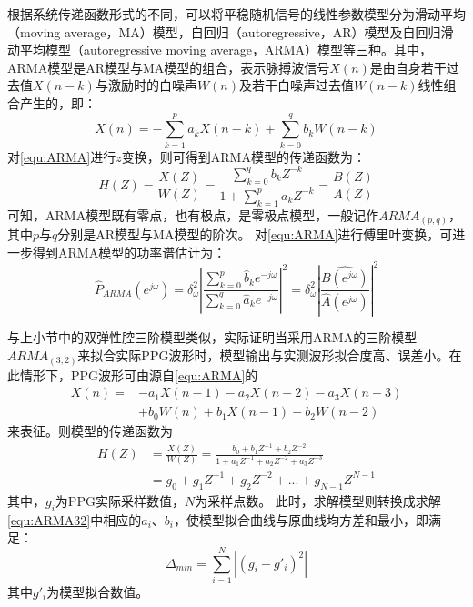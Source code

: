 根据系统传递函数形式的不同，可以将平稳随机信号的线性参数模型分为滑动平均（moving average，MA）模型，自回归（autoregressive，AR）模型及自回归滑动平均模型（autoregressive moving average，ARMA）模型等三种。其中，
ARMA模型是AR模型与MA模型的组合，表示脉搏波信号$X(n)$是由自身若干过去值$X(n-k)$与激励时的白噪声$W(n)$及若干白噪声过去值$W(n-k)$线性组合产生的，即：
\begin{equation}
    \label{equ:ARMA}
    X(n)=-\sum_{k=1}^{p}a_{k}X(n-k)+\sum_{k=0}^{q}b_{k}W(n-k)
\end{equation}
对\autoref{equ:ARMA}进行$z$变换，则可得到ARMA模型的传递函数为：
\begin{equation}
    \label{equ:ARMAH}
    H(Z)=\frac{X(Z)}{W(Z)}=\frac{\sum_{k=0}^{q}b_{k}Z^{-k}}{1+\sum_{k=1}^{p}a_{k}Z^{-k}}=\frac{B(Z)}{A(Z)}
\end{equation}
可知，ARMA模型既有零点，也有极点，是零极点模型，一般记作$ARMA_{(p,q)}$，其中$p$与$q$分别是AR模型与MA模型的阶次。
对\autoref{equ:ARMA}进行傅里叶变换，可进一步得到ARMA模型的功率谱估计为\cite{Qiu2012}：
\begin{equation}
    \label{equ:ARMAP}
    \hat{P}_{ARMA}(e^{j\omega} )=
    \delta _{\omega}^2\left |  \frac{\sum_{k=0}^{p}\hat{b}_{k}e^{-j\omega}}{\sum_{k=0}^{q}\hat{a}_{k}e^{-j\omega}}\right |^2
    =\delta _{\omega}^2\left |  \frac{\hat{B(e^{j\omega} )}}{\hat{A}(e^{j\omega} )}\right |^2
\end{equation}

与上小节中的双弹性腔三阶模型类似，实际证明当采用ARMA的三阶模型$ARMA_{(3,2)}$来拟合实际PPG波形时，模型输出与实测波形拟合度高、误差小\cite{PPGYY}。在此情形下，PPG波形可由源自\autoref{equ:ARMA}的
\begin{equation}
    \label{equ:ARMA32}
    \begin{aligned}
        X(n)=&-a_{1}X(n-1)-a_{2}X(n-2)-a_{3}X(n-3)\\
        &+b_{0}W(n)+b_{1}X(n-1)+b_{2}W(n-2)
    \end{aligned}
\end{equation}
来表征。则模型的传递函数为
\begin{equation}
    \label{equ:ARMAH32}
    \begin{aligned}
        H(Z)&=\frac{X(Z)}{W(Z)}=\frac{b_{0}+b_{1}Z^{-1}+b_{2}Z^{-2}}{1+a_{1}Z^{-1}+a_{2}Z^{-2}+a_{3}Z^{-3}}\\
        &=g_{0}+g_{1}Z^{-1}+g_{2}Z^{-2}+...+g_{N-1}Z^{N-1}
    \end{aligned}
\end{equation}
其中，$g_{i}$为PPG实际采样数值，$N$为采样点数。
此时，求解模型则转换成求解\autoref{equ:ARMA32}中相应的$a_{i}$、$b_{i}$，使模型拟合曲线与原曲线均方差和最小，即满足：
\begin{equation}
    \label{equ:MeanSum}
    \Delta_{min}=\sum_{i=1}^{N}\left |  (g_i-g'_i)^2\right |
\end{equation}
其中$g'_i$为模型拟合数值。

